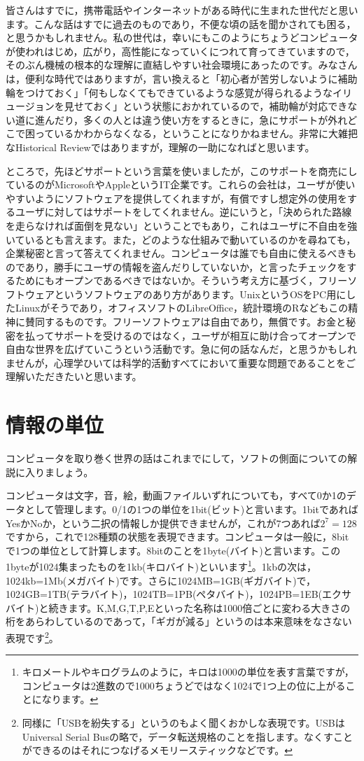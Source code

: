 \documentclass{ltjsbook}
\begin{document}
皆さんはすでに，携帯電話やインターネットがある時代に生まれた世代だと思います。こんな話はすでに過去のものであり，不便な頃の話を聞かされても困る，と思うかもしれません。私の世代は，幸いにもこのようにちょうどコンピュータが使われはじめ，広がり，高性能になっていくにつれて育ってきていますので，そのぶん機械の根本的な理解に直結しやすい社会環境にあったのです。みなさんは，便利な時代ではありますが，言い換えると「初心者が苦労しないように補助輪をつけておく」「何もしなくてもできているような感覚が得られるようなイリュージョンを見せておく」という状態におかれているので，補助輪が対応できない道に進んだり，多くの人とは違う使い方をするときに，急にサポートが外れどこで困っているかわからなくなる，ということになりかねません。非常に大雑把なHistorical Reviewではありますが，理解の一助になればと思います。

ところで，先ほどサポートという言葉を使いましたが，このサポートを商売にしているのがMicrosoftやAppleというIT企業です。これらの会社は，ユーザが使いやすいようにソフトウェアを提供してくれますが，有償ですし想定外の使用をするユーザに対してはサポートをしてくれません。逆にいうと，「決められた路線を走らなければ面倒を見ない」ということでもあり，これはユーザに不自由を強いているとも言えます。また，どのような仕組みで動いているのかを尋ねても，企業秘密と言って答えてくれません。コンピュータは誰でも自由に使えるべきものであり，勝手にユーザの情報を盗んだりしていないか，と言ったチェックをするためにもオープンであるべきではないか。そういう考え方に基づく，フリーソフトウェアというソフトウェアのあり方があります。UnixというOSをPC用にしたLinuxがそうであり，オフィスソフトのLibreOffice，統計環境のRなどもこの精神に賛同するものです。フリーソフトウェアは自由であり，無償です。お金と秘密を払ってサポートを受けるのではなく，ユーザが相互に助け合ってオープンで自由な世界を広げていこうという活動です。急に何の話なんだ，と思うかもしれませんが，心理学ひいては科学的活動すべてにおいて重要な問題であることをご理解いただきたいと思います。

\section{情報の単位}
コンピュータを取り巻く世界の話はこれまでにして，ソフトの側面についての解説に入りましょう。

コンピュータは文字，音，絵，動画ファイルいずれについても，すべて0か1のデータとして管理します。0/1の1つの単位を1bit(ビット)と言います。1bitであればYesかNoか，という二択の情報しか提供できませんが，これが7つあれば$2^7=128$ですから，これで128種類の状態を表現できます。コンピュータは一般に，8bitで1つの単位として計算します。8bitのことを1byte(バイト)と言います。この1byteが1024集まったものを1kb(キロバイト)といいます\footnote{キロメートルやキログラムのように，キロは1000の単位を表す言葉ですが，コンピュータは2進数ので1000ちょうどではなく1024で1つ上の位に上がることになります。}。1kbの次は，1024kb=1Mb(メガバイト)です。さらに1024MB=1GB(ギガバイト)で，1024GB=1TB(テラバイト)，1024TB=1PB(ペタバイト)，1024PB=1EB(エクサバイト)と続きます。K,M,G,T,P,Eといった名称は1000倍ごとに変わる大きさの桁をあらわしているのであって，「ギガが減る」というのは本来意味をなさない表現です\footnote{同様に「USBを紛失する」というのもよく聞くおかしな表現です。USBはUniversal Serial Busの略で，データ転送規格のことを指します。なくすことができるのはそれにつなげるメモリースティックなどです。}。
\end{document}
